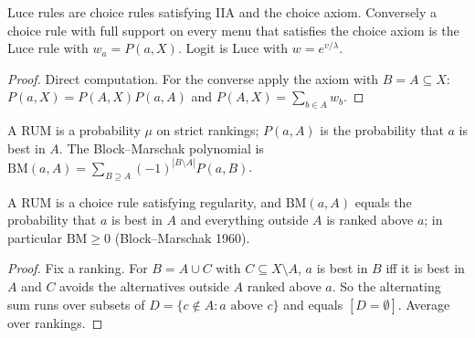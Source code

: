 \begin{theorem}[Luce 1959]
\label{thm:beh-luce}
\leanok
{}
Luce rules are choice rules satisfying IIA and the choice axiom. Conversely a choice rule with full support on every
menu that satisfies the choice axiom is the Luce rule with $w_a=P(a,X)$. Logit is Luce with $w=e^{v/\lambda}$.
\end{theorem}
\begin{proof}
\leanok
Direct computation. For the converse apply the axiom with $B=A\subseteq X$: $P(a,X)=P(A,X)P(a,A)$ and
$P(A,X)=\sum_{b\in A}w_b$.
\end{proof}

\begin{definition}
\label{def:beh-rum}
\leanok
A RUM is a probability $\mu$ on strict rankings; $P(a,A)$ is the probability that $a$ is best in $A$.
The Block--Marschak polynomial is $\mathrm{BM}(a,A)=\sum_{B\supseteq A}(-1)^{|B\setminus A|}P(a,B)$.
\end{definition}

\begin{theorem}
\label{thm:beh-bm}
\leanok
{}
A RUM is a choice rule satisfying regularity, and $\mathrm{BM}(a,A)$ equals the probability that $a$ is best in $A$
and everything outside $A$ is ranked above $a$; in particular $\mathrm{BM}\ge0$ (Block--Marschak 1960).
\end{theorem}
\begin{proof}
\leanok
Fix a ranking. For $B=A\cup C$ with $C\subseteq X\setminus A$, $a$ is best in $B$ iff it is best in $A$ and $C$
avoids the alternatives outside $A$ ranked above $a$. So the alternating sum runs over subsets of
$D=\{c\notin A: a\text{ above }c\}$ and equals $[D=\emptyset]$. Average over rankings.
\end{proof}


